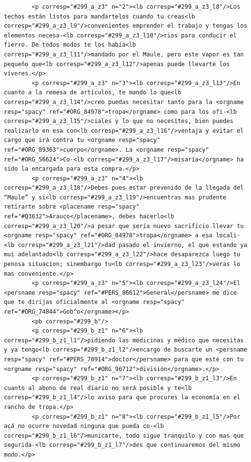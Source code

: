 \begin{verbatim}
        <p corresp="#299_a_z3" n="2"><lb corresp="#299_a_z3_l8"/>Los techos están listos para mandartelos cuando tu creas<lb corresp="#299_a_z3_l9"/>convenientes emprender el trabajo y tengas los elementos necesa-<lb corresp="#299_a_z3_l10"/>rios para conducir el fierro. De todos modos te los había<lb corresp="#299_a_z3_l11"/>mandado por el Maule, pero este vapor es tan pequeño que<lb corresp="#299_a_z3_l12"/>apenas puede llevarte los víveres.</p>
        <p corresp="#299_a_z3" n="3"><lb corresp="#299_a_z3_l13"/>En cuanto a la remesa de artículos, te mando lo que<lb corresp="#299_a_z3_l14"/>creo puedas necesitar tanto para la <orgname resp="spacy" ref="#ORG_84978">tropa</orgname> como para los ofi-<lb corresp="#299_a_z3_l15"/>ciales y lo que no necesites, bien puedes realizarlo en esa con<lb corresp="#299_a_z3_l16"/>ventaja y evitar el cargo que irá contra tu <orgname resp="spacy" ref="#ORG_89363">cuerpo</orgname>. La <orgname resp="spacy" ref="#ORG_56624">Co-<lb corresp="#299_a_z3_l17"/>misaría</orgname> ha sido la encargada para esta compra.</p>
        <p corresp="#299_a_z3" n="4"><lb corresp="#299_a_z3_l18"/>Debes pues estar prevenido de la llegada del “Maule” y si<lb corresp="#299_a_z3_l19"/>encuentras mas prudente retirarte sobre <placename resp="spacy" ref="#Q3632">Arauco</placename>, debes hacerlo<lb corresp="#299_a_z3_l20"/>a pesar que sería nuevo sacrificio llevar tu <orgname resp="spacy" ref="#ORG_84978">tropa</orgname> a esa locali-<lb corresp="#299_a_z3_l21"/>dad pasado el invierno, el que estando ya mui adelantado<lb corresp="#299_a_z3_l22"/>hace desaparezca luego tu penosa situacion; sinembargo tu<lb corresp="#299_a_z3_l23"/>veras lo mas conveniente.</p>
        <p corresp="#299_a_z3" n="5"><lb corresp="#299_a_z3_l24"/>El <persname resp="spacy" ref="#PERS_86612">General</persname> me dice que te dirijas oficialmente al <orgname resp="spacy" ref="#ORG_74844">Gob^o</orgname></p>
        <pb corresp="#299_b"/>
        <p corresp="#299_b_z1" n="6"><lb corresp="#299_b_z1_l1"/>pidiendo las medicinas y médico que necesitas y ya tengo<lb corresp="#299_b_z1_l2"/>encargo de buscarte un <persname resp="spacy" ref="#PERS_70914">doctor</persname> para que esté con tu <orgname resp="spacy" ref="#ORG_96712">división</orgname>.</p>
        <p corresp="#299_b_z1" n="7"><lb corresp="#299_b_z1_l3"/>En cuanto al abono de real diario no será posible y te<lb corresp="#299_b_z1_l4"/>lo aviso para que procures la economía en el rancho de tropa.</p>
        <p corresp="#299_b_z1" n="8"><lb corresp="#299_b_z1_l5"/>Por acá no ocurre novedad ninguna que pueda co-<lb corresp="#299_b_z1_l6"/>municarte, todo sigue tranquilo y con mas que segurida-<lb corresp="#299_b_z1_l7"/>des que continuaremos del mismo modo.</p>

\end{verbatim}
